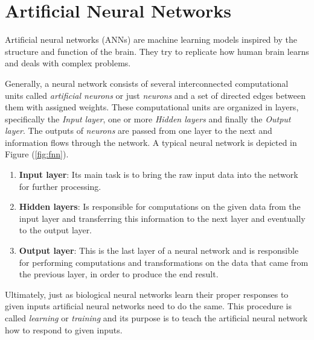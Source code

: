 \documentclass[a4paper, 12pt]{article}
\numberwithin{equation}{section}
\numberwithin{figure}{section}
\numberwithin{table}{section}
\begin{document}
	\newpage
	
	\section{Artificial Neural Networks}
	
	Artificial neural networks (ANNs) are machine learning models inspired by the structure and function of the brain. They try to replicate how human brain learns and deals with complex problems.\par 
	Generally, a neural network consists of several interconnected computational units called \textit {artificial neurons} or just \textit {neurons} and a set of directed edges between them with assigned weights. These computational units are organized in layers, specifically the \textit{Input layer}, one or more \textit{Hidden layers} and finally the \textit{Output layer}. The outputs of \textit{neurons} are passed from one layer to the next and information flows through the network. A typical neural network is depicted in Figure (\ref{fig:fnn}).\par
	
	
	\begin{enumerate}
		\item \textbf{Input layer}: Its main task is to bring the raw input data into the
		network for further processing.
		
		\item \textbf{Hidden layers}:  Is responsible for computations on the given data from the input layer and transferring this information to the next layer and eventually to the output layer.
		
		\item \textbf{Output layer}: This is the last layer of a neural network and is responsible for performing computations and transformations on the data that came from the previous layer, in order to produce the end result.
	\end{enumerate}

	Ultimately, just as biological neural networks learn their proper responses to given inputs artificial neural networks need to do the same. This procedure is called \textit{learning} or \textit{training} and its purpose is to teach the artificial neural network how to respond to given inputs.
	
\end{document}
